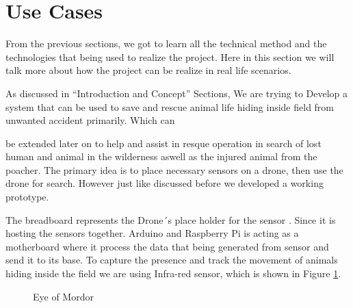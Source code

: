 \documentclass[12pt]{article}
\begin{document}
\section{Use Cases}

From the previous sections, we got to learn all the technical method and the technologies that being used to realize the project. Here in this section we will talk more about how the project can be realize in real life scenarios.

As discussed in “Introduction and Concept” Sections, We are trying to Develop a system that can be used to save and rescue animal life hiding inside field from unwanted accident primarily. Which can

be extended later on to help and assist in resque operation in search of lost human and animal in the wilderness aswell as the injured animal from the poacher. The primary idea is to place necessary sensors on a drone, then use the drone for search. However just like discussed before we developed a working prototype.

The breadboard represents the Drone´s place holder for the sensor . Since it is hosting the sensors together. Arduino and Raspberry Pi is acting as a motherboard where it process the data that being generated from sensor and send it to its base. To capture the presence and track the movement of animals hiding inside the field we are using Infra-red sensor, which is shown in Figure \ref{fig::eye1}. 

\begin{figure}[!h]
\caption{Eye of Mordor}
\label{fig::eye1}
\end{figure}
\end{document}
